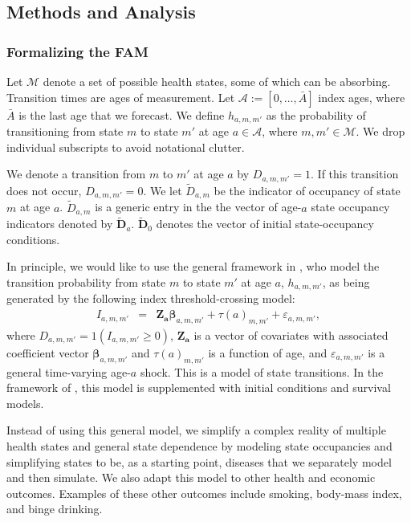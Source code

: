 \subsection{Methods and Analysis}

\subsubsection{Formalizing the FAM}
\label{section:transition_models}

Let $\mathcal{M}$ denote a set of possible health states, some of which can be absorbing. Transition times are ages of measurement. Let $\mathcal{A}:= [ 0, \ldots, \bar{A}]$ index ages, where $\bar{A}$ is the last age that we forecast. We define $h_{a,m,m'}$ as the probability of transitioning from state $m$ to state $m'$ at age $a \in \mathcal{A}$, where $m, m' \in \mathcal{M}$. We drop individual subscripts to avoid notational clutter.

We denote a transition from $m$ to $m'$ at age $a$ by $D_{a,m,m'} = 1$. If this transition does not occur,  $D_{a,m,m'} = 0$. We let $\tilde{D}_{a,m}$ be the indicator of occupancy of state $m$ at age $a$. $\tilde{D}_{a,m}$ is a generic entry in the the vector of age-$a$ state occupancy indicators denoted by $\tilde{\bm{D}}_a$. $\tilde{\bm{D}}_0$ denotes the vector of initial state-occupancy conditions.

In principle, we would like to use the general framework in \citet{Heckman_1981_heterogeneity,Heckman_1981_IncidentalParametersProblem}, who model the transition probability from state $m$ to state $m'$ at age $a$, $h_{a,m,m'}$, as being generated by the following index threshold-crossing model:
\begin{eqnarray}
I_{a,m,m'} &=& \bm{Z_a} \bm{\beta}_{a,m,m'} + \tau \left( a \right)_{m,m'} + \varepsilon_{a,m,m'}, \label{eq:trans0}
\end{eqnarray}
where $D_{a,m,m'} = \bm{\mathit{1}}  \left( I_{a,m,m'} \geq 0 \right)$, $\bm{Z_a}$ is a vector of covariates with associated coefficient vector $ \bm{\beta}_{a,m,m'}$ and $\tau \left( a \right)_{m,m'}$ is a function of age, and $\varepsilon_{a,m,m'}$ is a general time-varying age-$a$ shock. This is a model of state transitions. In the framework of  \citet{Heckman_1981_heterogeneity,Heckman_1981_IncidentalParametersProblem}, this model is supplemented with initial conditions and survival models.

Instead of using this general model, we simplify a complex reality of multiple health states and general state dependence by modeling state occupancies and simplifying states to be, as a starting point, diseases that we separately model and then simulate. We also adapt this model to other health and economic outcomes. Examples of these other outcomes include smoking, body-mass index, and binge drinking.

